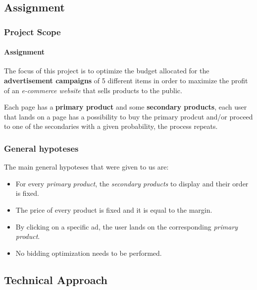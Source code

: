 
\subsection{Assignment}


\begin{frame}

\frametitle{Project Scope}
\framesubtitle{Assignment}

The focus of this project is to optimize the budget allocated for the \textbf{advertisement campaigns} of 5 different items in order to maximize the profit of an \textit{e-commerce website} that sells products to the public.

Each page has a \textbf{primary product} and some \textbf{secondary products}, each user that lands on a page has a possibility to buy the primary prodcut and/or proceed to one of the secondaries with a given probability, the process repeats.

\end{frame}



\begin{frame}

\frametitle{General hypoteses}

The main general hypoteses that were given to us are:
\begin{itemize}[label={-}]
    \item For every \textit{primary product}, the \textit{secondary products} to display and their order is fixed.
    \item The price of every product is fixed and it is equal to the margin.
    \item By clicking on a specific ad, the user lands on the corresponding \textit{primary product}.
    \item No bidding optimization needs to be performed.
\end{itemize}

\end{frame}


\subsection{Technical Approach}

